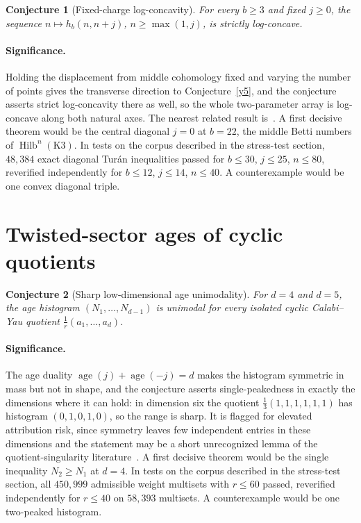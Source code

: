 \documentclass[11pt]{article}
\newtheorem{conjecture}{Conjecture}
\theoremstyle{definition}
\begin{document}
\begin{conjecture}[Fixed-charge log-concavity]\label{y8}
For every $b\ge3$ and fixed $j\ge0$, the sequence $n\mapsto h_b(n,n+j)$, $n\ge\max(1,j)$, is strictly log-concave.
\end{conjecture}

\paragraph{Significance.}
Holding the displacement from middle cohomology fixed and varying the number of points gives the transverse direction to Conjecture~\ref{y5}, and the conjecture asserts strict log-concavity there as well, so the whole two-parameter array is log-concave along both natural axes.  The nearest related result is~\cite{Go90}.  A first decisive theorem would be the central diagonal $j=0$ at $b=22$, the middle Betti numbers of $\operatorname{Hilb}^n(\mathrm{K3})$.  In tests on the corpus described in the stress-test section, $48{,}384$ exact diagonal Tur\'an inequalities passed for $b\le30$, $j\le25$, $n\le80$, reverified independently for $b\le12$, $j\le14$, $n\le40$.  A counterexample would be one convex diagonal triple.

\section{Twisted-sector ages of cyclic quotients}

\begin{conjecture}[Sharp low-dimensional age unimodality]\label{y9}
For $d=4$ and $d=5$, the age histogram $(N_1,\ldots,N_{d-1})$ is unimodal for every isolated cyclic Calabi--Yau quotient $\tfrac1r(a_1,\ldots,a_d)$.
\end{conjecture}

\paragraph{Significance.}
The age duality $\operatorname{age}(j)+\operatorname{age}(-j)=d$ makes the histogram symmetric in mass but not in shape, and the conjecture asserts single-peakedness in exactly the dimensions where it can hold: in dimension six the quotient $\tfrac13(1,1,1,1,1,1)$ has histogram $(0,1,0,1,0)$, so the range is sharp.  It is flagged for elevated attribution risk, since symmetry leaves few independent entries in these dimensions and the statement may be a short unrecognized lemma of the quotient-singularity literature~\cite{Reid02}.  A first decisive theorem would be the single inequality $N_2\ge N_1$ at $d=4$.  In tests on the corpus described in the stress-test section, all $450{,}999$ admissible weight multisets with $r\le60$ passed, reverified independently for $r\le40$ on $58{,}393$ multisets.  A counterexample would be one two-peaked histogram.
\end{document}
